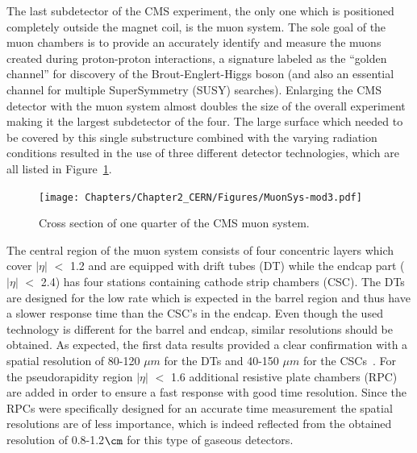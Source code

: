 The last subdetector of the CMS experiment, the only one which is positioned completely outside the magnet coil, is the muon system. The sole goal of the muon chambers is to provide an accurately identify and measure the muons created during proton-proton interactions, a signature labeled as the ``golden channel'' for discovery of the Brout-Englert-Higgs boson (and also an essential channel for multiple SuperSymmetry (SUSY) searches). 
Enlarging the CMS detector with the muon system almost doubles the size of the overall experiment making it the largest subdetector of the four. 
The large surface which needed to be covered by this single substructure combined with the varying radiation conditions resulted in the use of three different detector technologies, which are all listed in Figure~\ref{fig::MuonAndCMS}.
\begin{figure}[h!t]
 \centering
 \texttt{[image: Chapters/Chapter2\_CERN/Figures/MuonSys-mod3.pdf]}
 \caption{Cross section of one quarter of the CMS muon system.} \label{fig::MuonAndCMS}
\end{figure}

The central region of the muon system consists of four concentric layers which cover $\vert \eta \vert$ $<$ 1.2 and are equipped with drift tubes (DT) while the endcap part ($\vert \eta \vert$ $<$ 2.4) has four stations containing cathode strip chambers (CSC). The DTs are designed for the low rate which is expected in the barrel region and thus have a slower response time than the CSC's in the endcap. Even though the used technology is different for the barrel and endcap, similar resolutions should be obtained. As expected, the first data results provided a clear confirmation with a spatial resolution of 80-120 $\unit{\mu m}$ for the DTs and 40-150 $\unit{\mu m}$ for the CSCs~\cite{MuonPerformance}. For the pseudorapidity region $\vert \eta \vert$ $<$ 1.6 additional resistive plate chambers (RPC) are added in order to ensure a fast response with good time resolution. Since the RPCs were specifically designed for an accurate time measurement the spatial resolutions are of less importance, which is indeed reflected from the obtained resolution of 0.8-1.2$\cm$ for this type of gaseous detectors.

